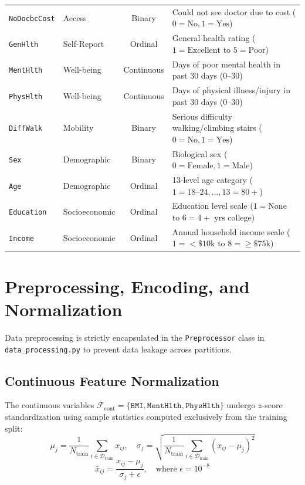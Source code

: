 \documentclass[11pt,a4paper]{report}
\begin{document}
\begin{table}[htbp]
\begin{tabularx}{\textwidth}{llcX}
    \texttt{NoDocbcCost} & Access & Binary & Could not see doctor due to cost ($0=\text{No}, 1=\text{Yes}$) \\
    \texttt{GenHlth} & Self-Report & Ordinal & General health rating ($1=\text{Excellent}$ to $5=\text{Poor}$) \\
    \texttt{MentHlth} & Well-being & Continuous & Days of poor mental health in past 30 days (0--30) \\
    \texttt{PhysHlth} & Well-being & Continuous & Days of physical illness/injury in past 30 days (0--30) \\
    \texttt{DiffWalk} & Mobility & Binary & Serious difficulty walking/climbing stairs ($0=\text{No}, 1=\text{Yes}$) \\
    \texttt{Sex} & Demographic & Binary & Biological sex ($0=\text{Female}, 1=\text{Male}$) \\
    \texttt{Age} & Demographic & Ordinal & 13-level age category ($1=18\text{--}24, \dots, 13=80+$) \\
    \texttt{Education} & Socioeconomic & Ordinal & Education level scale ($1=\text{None}$ to $6=4+\text{ yrs college}$) \\
    \texttt{Income} & Socioeconomic & Ordinal & Annual household income scale ($1=<\$10\text{k}$ to $8=\ge\$75\text{k}$) \\
    \bottomrule
  \end{tabularx}
\end{table}

\section{Preprocessing, Encoding, and Normalization}
Data preprocessing is strictly encapsulated in the \texttt{Preprocessor} class in \texttt{data\_processing.py} to prevent data leakage across partitions.

\subsection{Continuous Feature Normalization}
The continuous variables $\mathcal{F}_{\text{cont}} = \{\texttt{BMI}, \texttt{MentHlth}, \texttt{PhysHlth}\}$ undergo $z$-score standardization using sample statistics computed exclusively from the training split:
\begin{equation}
  \mu_j = \frac{1}{N_{\text{train}}} \sum_{i \in \mathcal{D}_{\text{train}}} x_{ij}, \quad
  \sigma_j = \sqrt{\frac{1}{N_{\text{train}}} \sum_{i \in \mathcal{D}_{\text{train}}} (x_{ij} - \mu_j)^2}
\end{equation}
\begin{equation}
  \bar{x}_{ij} = \frac{x_{ij} - \mu_j}{\sigma_j + \epsilon}, \quad \text{where } \epsilon = 10^{-8}
\end{equation}
\end{document}
